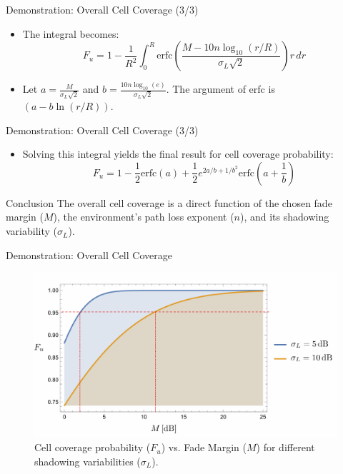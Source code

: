 \documentclass{beamer}
\begin{document}
	\begin{frame}{Demonstration: Overall Cell Coverage (3/3)}
		\begin{itemize}
			\item The integral becomes:
			\[ F_u = 1 - \frac{1}{R^2} \int_0^R \text{erfc}\left( \frac{M - 10n \log_{10}(r/R)}{\sigma_L\sqrt{2}} \right) r \, dr \]
			\item Let $a = \frac{M}{\sigma_L\sqrt{2}}$ and $b = \frac{10n \log_{10}(e)}{\sigma_L\sqrt{2}}$. The argument of erfc is $(a - b \ln(r/R))$.
			
		\end{itemize}
		
	\end{frame}
	
	\begin{frame}{Demonstration: Overall Cell Coverage (3/3)}
		\begin{itemize}
			
			\item Solving this integral yields the final result for cell coverage probability:
			\[ F_u = 1 - \frac{1}{2}\text{erfc}(a) + \frac{1}{2}e^{2a/b + 1/b^2} \text{erfc}\left(a + \frac{1}{b}\right) \]
		\end{itemize}
		\begin{block}{Conclusion}
			The overall cell coverage is a direct function of the chosen fade margin ($M$), the environment's path loss exponent ($n$), and its shadowing variability ($\sigma_L$).
		\end{block}
	\end{frame}
	
	\begin{frame}{Demonstration: Overall Cell Coverage}
		\begin{figure}
			\centering
			\includegraphics[width=0.9\linewidth]{"pictures/fu-vs-margin.png"}
			\caption{Cell coverage probability ($F_u$) vs. Fade Margin ($M$) for different shadowing variabilities ($\sigma_L$).}
		\end{figure}
	\end{frame}
	
\end{document}
